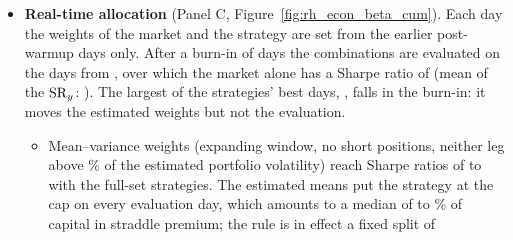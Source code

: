 \begin{itemize}
  ($p = \rhebGrsPShort$).
  \begin{itemize}
  \item In the tangency portfolio the strategy carries \rhebTanShareFullMin{} to \rhebTanShareFullMax\% of the
    volatility. The market's Sharpe ratio over the sample is low, so the in-sample optimum is almost the strategy
    alone; the strategy's leverage is arbitrary, so this share, not a dollar weight, is the allocation.
  \item The paired block bootstrap of the gain, with the weights re-estimated in each resample, gives $p$ from
    \rhebDSRmaxPFullMin{} to \rhebDSRmaxPFullMax{} (95\% intervals with lower ends from \rhebDSRmaxLoFullMin{} to
    \rhebDSRmaxLoFullMax). The gain cannot be negative, so this test rejects in one tail only and its $p$ lies below
    the GRS $p$: for the \rhebNHarDistinctWord{} distinct HAR-set forecasts it is below 5\% for
    \rhebBootSigHarWord{} and the GRS $p$ for none. The GRS test and the $t$-statistic of $\alpha$ are the tests of
    record.
  \end{itemize}
\item \textbf{Real-time allocation} (Panel C, Figure~\ref{fig:rh_econ_beta_cum}). Each day the weights of the market
  and the strategy are set from the earlier post-warmup days only. After a burn-in of \rhebNBurn{} days the
  combinations are evaluated on the \rhebNRt{} days from \rhebRtFirst, over which the market alone has a Sharpe ratio
  of \rhebSRmRt{} (mean of the $\mathrm{SR}_y$: \rhebSRmRtDSix). The largest of the strategies' best days, \rhebTopDate,
  falls in the burn-in: it moves the estimated weights but not the evaluation.
  \begin{itemize}
  \item Mean--variance weights (expanding window, no short positions, neither leg above \rhebCap\% of the estimated
    portfolio volatility) reach Sharpe ratios of \rhebRtMvFullMin{} to \rhebRtMvFullMax{} with the full-set
    strategies. The estimated means put the strategy at the cap on every evaluation day, which amounts to a median of
    \rhebRtMvWsFullMin{} to \rhebRtMvWsFullMax\% of capital in straddle premium; the rule is in effect a fixed split of

\end{itemize}
\end{itemize}
